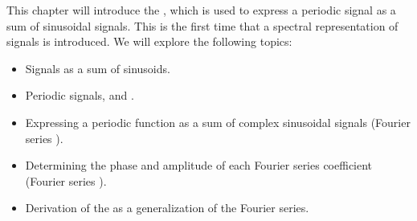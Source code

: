 This chapter will introduce the \emph{}, which is used to express a periodic signal as a sum of
sinusoidal signals. This is the first time that a spectral
representation of signals is introduced. We will explore the following
topics:
\begin{itemize}
  \item Signals as a sum of sinusoids.
  \item Periodic signals, \emph{} and \emph{}.
  \item Expressing a periodic function as a sum of complex sinusoidal signals (Fourier series ).
  \item Determining the phase and amplitude of each Fourier series coefficient (Fourier series ).
  \item Derivation of the \emph{} as a generalization of the Fourier series.
\end{itemize}

